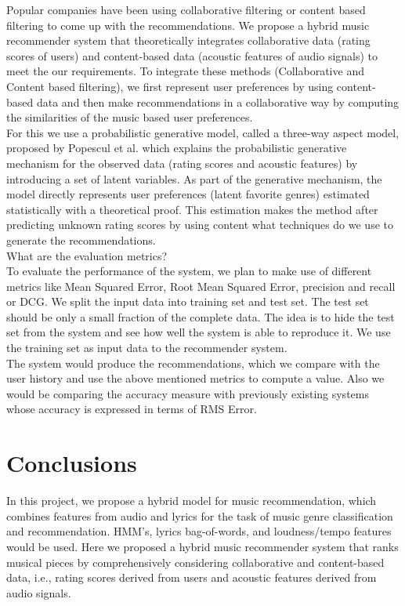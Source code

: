 \documentclass{sig-alternate-05-2015}
\begin{document}
Popular companies have been using collaborative filtering or content based filtering to come up with the recommendations. We propose a hybrid music recommender system that theoretically integrates collaborative data (rating scores of users) and content-based data (acoustic features of audio signals) to meet the our requirements. To integrate these methods (Collaborative and Content based filtering), we first represent user preferences by using content-based data and then make recommendations in a collaborative way by computing the similarities of the music based user preferences.\\

For this we use a probabilistic generative model, called a three-way aspect model, proposed by Popescul et al. which explains the probabilistic generative mechanism for the observed data (rating scores and acoustic features) by introducing a set of latent variables. As part of the generative mechanism, the model directly represents user preferences (latent favorite genres) estimated statistically with a theoretical proof. This estimation makes the method after predicting unknown rating scores by using content what techniques do we use to generate the recommendations.\\

What are the evaluation metrics? \\

To evaluate the performance of the system, we plan to make use of different metrics like Mean Squared Error, Root Mean Squared Error, precision and recall or DCG. We split the input data into training set and test set. The test set should be only a small fraction of the complete data. The idea is to hide the test set from the system and see how well the system is able to reproduce it. We use the training set as input data to the recommender system.\\

The system would produce the recommendations, which we compare with the user history and use the above mentioned metrics to compute a value. Also we would be comparing the accuracy measure with previously existing systems whose accuracy is expressed in terms of RMS Error.

\section{Conclusions}

In this project, we propose a hybrid model for music recommendation, which combines features from audio and lyrics for the task of music genre classification and recommendation. HMM's, lyrics bag-of-words, and loudness/tempo features would be used. Here we proposed a hybrid music recommender system that ranks musical pieces by comprehensively considering collaborative and content-based data, i.e., rating scores derived from users and acoustic features derived from audio signals.\\
\end{document}
